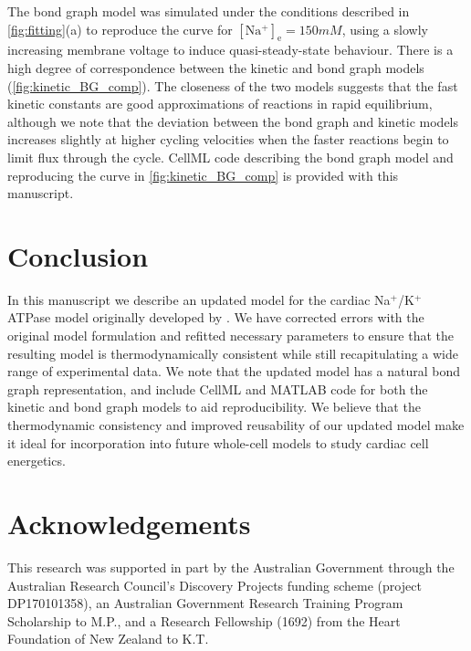 \documentclass[11pt]{article}
\begin{document}
The bond graph model was simulated under the conditions described in \autoref{fig:fitting}(a) to reproduce the curve for $\mathrm{[Na^+]_e}=150\si{mM}$, using a slowly increasing membrane voltage to induce quasi-steady-state behaviour. There is a high degree of correspondence between the kinetic and bond graph models (\autoref{fig:kinetic_BG_comp}). The closeness of the two models suggests that the fast kinetic constants are good approximations of reactions in rapid equilibrium, although we note that the deviation between the bond graph and kinetic models increases slightly at higher cycling velocities when the faster reactions begin to limit flux through the cycle. CellML code describing the bond graph model and reproducing the curve in \autoref{fig:kinetic_BG_comp} is provided with this manuscript.

\section{Conclusion}
In this manuscript we describe an updated model for the cardiac Na$^+$/K$^+$ ATPase model originally developed by \citet{terkildsen_balance_2007}. We have corrected errors with the original model formulation and refitted necessary parameters to ensure that the resulting model is thermodynamically consistent while still recapitulating a wide range of experimental data. We note that the updated model has a natural bond graph representation, and include CellML and MATLAB code for both the kinetic and bond graph models to aid reproducibility. We believe that the thermodynamic consistency and improved reusability of our updated model make it ideal for incorporation into future whole-cell models to study cardiac cell energetics.

\section{Acknowledgements}
This research was supported in part by the Australian Government through the Australian Research Council's Discovery Projects funding scheme (project DP170101358), an Australian Government Research Training Program Scholarship to M.P., and a Research Fellowship (1692) from the Heart Foundation of New Zealand to K.T.


\small
{}
\normalsize

\appendix
\end{document}
